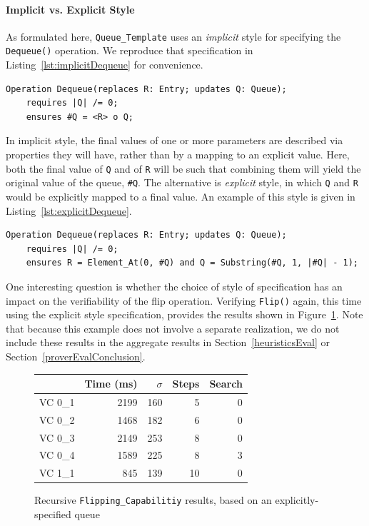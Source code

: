 \paragraph{Implicit vs. Explicit Style}As formulated here, \texttt{Queue\_Template} uses an \emph{implicit} style for specifying the \texttt{Dequeue()} operation.  We reproduce that specification in Listing~\ref{lst:implicitDequeue} for convenience.

\begin{lstlisting}[float=h,language=resolve,caption={An implicit-style specification for \texttt{Dequeue()}\label{lst:implicitDequeue}}]
Operation Dequeue(replaces R: Entry; updates Q: Queue);
	requires |Q| /= 0;
	ensures #Q = <R> o Q;
\end{lstlisting}

In implicit style, the final values of one or more parameters are described via properties they will have, rather than by a mapping to an explicit value.  Here, both the final value of \texttt{Q} and of \texttt{R} will be such that combining them will yield the original value of the queue, \texttt{\#Q}.  The alternative is \emph{explicit} style, in which \texttt{Q} and \texttt{R} would be explicitly mapped to a final value.  An example of this style is given in Listing~\ref{lst:explicitDequeue}.

\begin{lstlisting}[float=h,language=resolve,caption={An explicit-style specification for \texttt{Dequeue()}\label{lst:explicitDequeue}}]
Operation Dequeue(replaces R: Entry; updates Q: Queue);
	requires |Q| /= 0;
	ensures R = Element_At(0, #Q) and Q = Substring(#Q, 1, |#Q| - 1);
\end{lstlisting}

One interesting question is whether the choice of style of specification has an impact on the verifiability of the flip operation.  Verifying \texttt{Flip()} again, this time using the explicit style specification, provides the results shown in Figure~\ref{fig:explicitFlippingResults}.  Note that because this example does not involve a separate realization, we do not include these results in the aggregate results in Section~\ref{heuristicsEval} or Section~\ref{proverEvalConclusion}.

\begin{figure}
	\centering
	\begin{tabular}{lrrrr}
		\toprule
			& Time (ms)	& $\sigma$& Steps & Search \\
		\midrule
		VC 0\_1	& 2199		& 160	& 5 	& 0     \\
		VC 0\_2	& 1468		& 182	& 6 	& 0     \\
		VC 0\_3	& 2149		& 253	& 8 	& 0     \\
		VC 0\_4	& 1589		& 225	& 8 	& 3     \\
		VC 1\_1	& 845		& 139	& 10	& 0     \\
		\bottomrule
	\end{tabular}
	\caption{Recursive \texttt{Flipping\_Capabilitiy} results, based on an explicitly-specified queue\label{fig:explicitFlippingResults}}
\end{figure}

